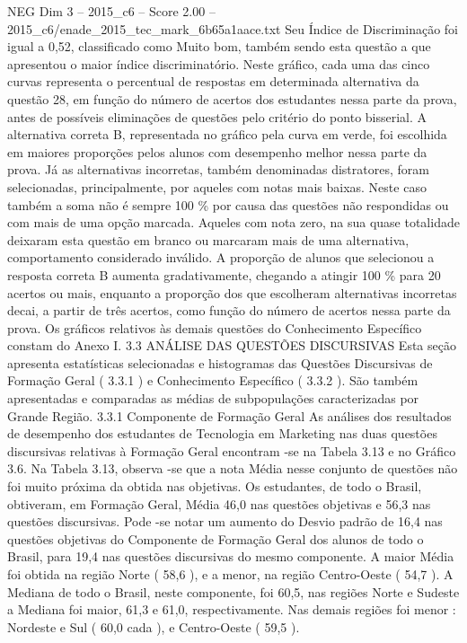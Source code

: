 \begin{textsample}{NEG Dim 3 – 2015\_c6 – Score 2.00 – 2015\_c6/enade\_2015\_tec\_mark\_6b65a1aace.txt}
Seu Índice de Discriminação foi igual a 0,52, classificado como Muito bom, também sendo esta questão a que apresentou o maior índice discriminatório.
Neste gráfico, cada uma das cinco curvas representa o percentual de respostas em determinada alternativa da questão 28, em função do número de acertos dos estudantes nessa parte da prova, antes de possíveis eliminações de questões pelo critério do ponto bisserial.
A alternativa correta B, representada no gráfico pela curva em verde, foi escolhida em maiores proporções pelos alunos com desempenho melhor nessa parte da prova.
Já as alternativas incorretas, também denominadas distratores, foram selecionadas, principalmente, por aqueles com notas mais baixas.
Neste caso também a soma não é sempre 100 \% por causa das questões não respondidas ou com mais de uma opção marcada.
Aqueles com nota zero, na sua quase totalidade deixaram esta questão em branco ou marcaram mais de uma alternativa, comportamento considerado inválido.
A proporção de alunos que selecionou a resposta correta B aumenta gradativamente, chegando a atingir 100 \% para 20 acertos ou mais, enquanto a proporção dos que escolheram alternativas incorretas decai, a partir de três acertos, como função do número de acertos nessa parte da prova.
Os gráficos relativos às demais questões do Conhecimento Específico constam do Anexo I. 3.3 ANÁLISE DAS QUESTÕES DISCURSIVAS Esta seção apresenta estatísticas selecionadas e histogramas das Questões Discursivas de Formação Geral ( 3.3.1 ) e Conhecimento Específico ( 3.3.2 ).
São também apresentadas e comparadas as médias de subpopulações caracterizadas por Grande Região. 3.3.1 Componente de Formação Geral As análises dos resultados de desempenho dos estudantes de Tecnologia em Marketing nas duas questões discursivas relativas à Formação Geral encontram -se na Tabela 3.13 e no Gráfico 3.6.
Na Tabela 3.13, observa -se que a nota Média nesse conjunto de questões não foi muito próxima da obtida nas objetivas.
Os estudantes, de todo o Brasil, obtiveram, em Formação Geral, Média 46,0 nas questões objetivas e 56,3 nas questões discursivas.
Pode -se notar um aumento do Desvio padrão de 16,4 nas questões objetivas do Componente de Formação Geral dos alunos de todo o Brasil, para 19,4 nas questões discursivas do mesmo componente.
A maior Média foi obtida na região Norte ( 58,6 ), e a menor, na região Centro-Oeste ( 54,7 ).
A Mediana de todo o Brasil, neste componente, foi 60,5, nas regiões Norte e Sudeste a Mediana foi maior, 61,3 e 61,0, respectivamente.
Nas demais regiões foi menor : Nordeste e Sul ( 60,0 cada ), e Centro-Oeste ( 59,5 ).

\end{textsample}
